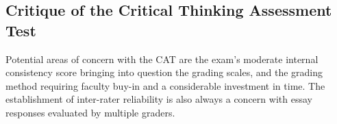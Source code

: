 \subsection{Critique of the Critical Thinking Assessment Test}

Potential areas of concern with the CAT are the exam’s moderate internal consistency score bringing into question the grading scales, and the grading method requiring faculty buy-in and a considerable investment in time. The establishment of inter-rater reliability is also always a concern with essay responses evaluated by multiple graders.